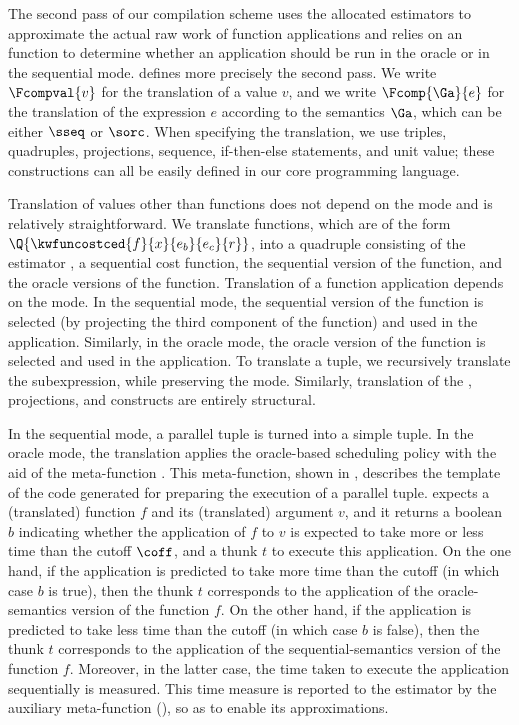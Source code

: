 The second pass of our compilation scheme uses the allocated
estimators to approximate the actual raw work of function applications
and relies on an  function to determine whether an
application should be run in the oracle or in the sequential mode.
 defines more precisely the second pass.  We write
$\Fcompval{v}$  for
 the translation of a value $v$, and we write
$\Fcomp{\Ga}{e}$ for the translation of the expression $e$ according to
the semantics $\Ga$, which can be either $\sseq$ or $\sorc$.  When
specifying the translation, we use triples, quadruples, projections,
sequence, if-then-else statements, and unit value; these constructions
can all be easily defined in our core programming language.


Translation of values other than functions does not depend on the mode
and is relatively straightforward.  We translate functions, which are
of the form $\Q{\kwfuncostced{f}{x}{e_b}{e_c}{r}}$, into a quadruple
consisting of the estimator , a sequential cost function, the
sequential version of the function, and the oracle versions of the
function.  Translation of a function application depends on the
mode. In the sequential mode, the sequential version of the function
is selected (by projecting the third component of the function) and
used in the application.  Similarly, in the oracle mode, the oracle
version of the function is selected and used in the application.  To
translate a tuple, we recursively translate the subexpression, while
preserving the mode.  Similarly, translation of the ,
projections, and  constructs are entirely structural.

In the sequential mode, a parallel tuple is turned into a simple tuple.
In the oracle mode, the translation applies the oracle-based scheduling
policy with the aid of the meta-function .  This
meta-function, shown in , describes
the template of the code generated for preparing the execution of a
parallel tuple.   expects a (translated) function $f$ and
its (translated) argument $v$, and it returns a boolean $b$ indicating
whether the application of $f$ to $v$ is expected to take more or less
time than the cutoff $\coff$, and a thunk $t$ to execute this application.  On
the one hand, if the application is predicted to take more time than
the cutoff (in which case $b$ is true), then the thunk $t$ corresponds
to the application of the 
oracle-semantics version of the function $f$.  On the other
hand, if the application is predicted to take less time than the
cutoff (in which case $b$ is false), then the thunk $t$ corresponds to
the application of the 
sequential-semantics version of the function $f$. Moreover, in the
latter case, the time taken to execute the application sequentially is
measured. This time measure is reported to the estimator by the auxiliary meta-function
 (), so as to enable
 its approximations.

